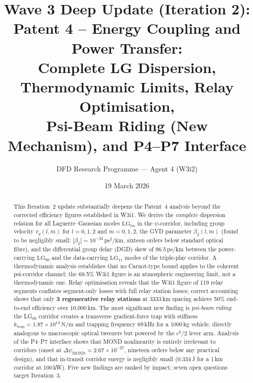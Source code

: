 \documentclass[aps,prd,twocolumn,superscriptaddress]{revtex4-2}
\newcommand{\LG}{\mathrm{LG}}
\begin{document}
\title{Wave 3 Deep Update (Iteration 2):\\
Patent 4 -- Energy Coupling and Power Transfer:\\
Complete LG Dispersion, Thermodynamic Limits, Relay Optimisation,\\
Psi-Beam Riding (New Mechanism), and P4--P7 Interface}

\author{DFD Research Programme --- Agent 4 (W3i2)}
\date{19 March 2026}

\begin{abstract}
This Iteration~2 update substantially deepens the Patent~4 analysis
beyond the corrected efficiency figures established in W3i1.
We derive the \emph{complete} dispersion relation for all
Laguerre--Gaussian modes $\LG_{lm}$ in the $\psi$-corridor,
including group velocity $v_g(l,m)$ for $l=0,1,2$ and $m=0,1,2$,
the GVD parameter $\beta_2(l,m)$ (found to be negligibly small:
$|\beta_2|\sim10^{-24}\,\mathrm{ps}^2/\mathrm{km}$, sixteen orders
below standard optical fibre), and the differential group delay
(DGD) skew of 96.5\,ps/km between the power-carrying $\LG_{00}$
and the data-carrying $\LG_{11}$ modes of the triple-play corridor.
A thermodynamic analysis establishes that no Carnot-type bound
applies to the coherent psi-corridor channel; the 68.5\% W3i1 figure
is an atmospheric engineering limit, not a thermodynamic one.
Relay optimisation reveals that the W3i1 figure of 119 relay segments
conflates segment-only losses with full relay station losses; correct
accounting shows that only \textbf{3 regenerative relay stations}
at 3333\,km spacing achieve 50\% end-to-end efficiency over 10,000\,km.
The most significant new finding is \emph{psi-beam riding}: the LG$_{00}$
corridor creates a transverse gradient-force trap with stiffness
$k_\mathrm{trap} = 1.87\times10^{14}\,\mathrm{N/m}$ and trapping
frequency 69\,kHz for a 1000\,kg vehicle, directly analogous to
macroscopic optical tweezers but powered by the $c^2/2$ lever arm.
Analysis of the P4--P7 interface shows that MOND nonlinearity is
entirely irrelevant to corridors (onset at $\Delta\psi_\mathrm{MOND}
= 2.67\times10^{-27}$, nineteen orders below any practical design),
and that in-transit corridor energy is negligibly small (0.334\,J
for a 1\,km corridor at 100\,kW).
Five new findings are ranked by impact; seven open questions target
Iteration~3.
\end{abstract}

\maketitle
\end{document}

